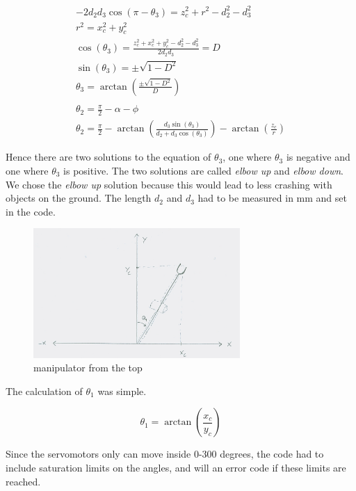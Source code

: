 \begin{displaymath}
\begin{split}
-2d_{2}d_{3}\cos(\pi - \theta_{3}) = z_{c}^2 + r^2 - d_{2}^2 - d_{3}^2\\
r^2 = x_{c}^2 + y_{c}^2\\
\cos(\theta_{3}) = \frac{z_{c}^2 + x_{c}^2 + y_{c}^2 - d_{2}^2 - d_{3}^2}{2d_{2}d_{3}} = D\\
\sin(\theta_{3}) = \pm\sqrt{1-D^2}\\
\theta_{3} = \arctan(\frac{\pm\sqrt{1-D^2}}{D})
\\
\\
\theta_{2} = \frac{\pi}{2} - \alpha - \phi\\
\theta_{2} = \frac{\pi}{2} - \arctan(\frac{d_{3}\sin(\theta_{3})}{d_{2}+d_{3}\cos(\theta_{3})}) - \arctan(\frac{z_{c}}{r})
\end{split}
\end{displaymath}

Hence there are two solutions to the equation of $\theta_{3}$, one where $\theta_{3}$ is negative and one where $\theta_{3}$ is positive. The two solutions are called \textit{elbow up} and \textit{elbow down}. We chose the \textit{elbow up} solution because this would lead to less crashing with objects on the ground.
The length $d_{2}$ and $d_{3}$ had to be measured in mm and set in the code.

\begin{figure}[H]
    \centering
    \includegraphics[width=0.7\textwidth]{graphics/Inverse_kinematic_2.jpg}
    \caption{manipulator from the top}
    \label{fig:manipulator_top} 
\end{figure}

The calculation of $\theta_{1}$ was simple.

$$\theta_{1} = \arctan(\frac{x_{c}}{y_{c}})$$

Since the servomotors only can move inside 0-300 degrees, the code had to include saturation limits on the angles, and will an error code if these limits are reached.
\bigskip

